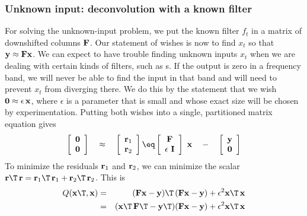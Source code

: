 \subsubsection{Unknown input: deconvolution with a known filter}
For solving the unknown-input problem,
we put the known filter $f_t$ in a matrix of downshifted columns $\bold F$.
Our statement of wishes is now to find $x_t$ so that
$\bold y \approx \bold F \bold x$.
We can expect to have trouble finding unknown inputs $x_t$
when we are dealing with certain kinds of filters,
such as s.
If the output is zero in a frequency band,
we will never be able to find the input in that band
and will need to prevent $x_t$ from diverging there.
We do this by the statement that we wish
$\bold 0\approx\epsilon\,\bold x$,
where $\epsilon$ is a parameter that is small
and whose exact size will be chosen by experimentation.
Putting both wishes into a single, partitioned matrix equation gives
\begin{equation}
 \left[ 
  \begin{array}{c}
   \bold 0 \\ 
   \bold 0
  \end{array}
 \right] 
\quad\approx\quad
 \left[ 
  \begin{array}{c}
   \bold r_1 \\ 
   \bold r_2
  \end{array}
 \right] 
\eq
 \left[ 
  \begin{array}{c}
   \bold F \\ 
   \epsilon \  \bold I
  \end{array}
 \right] 
 \ 
 \bold x
\quad - \quad
 \left[ 
  \begin{array}{c}
   \bold y \\ 
   \bold 0
  \end{array}
 \right] 
\end{equation}
To minimize the residuals $\bold r_1$ and $\bold r_2$,
we can minimize the scalar
$\bold r\T\, \bold r = \bold r_1\T\, \bold r_1 + \bold r_2\T\, \bold r_2$.
This is
\begin{eqnarray}
Q(\bold x\T, \bold x) &=& (\bold F  \bold x  - \bold y)\T\,(\bold F\bold x-\bold y)
                                        + \epsilon^2 \bold x\T\,\bold x
                                                                \nonumber \\
                     &=& (\bold x\T\,\bold F\T - \bold y\T) (\bold F\bold x-\bold y)
                                        + \epsilon^2 \bold x\T\,\bold x
\label{eqn:knownfilt}
\end{eqnarray}
